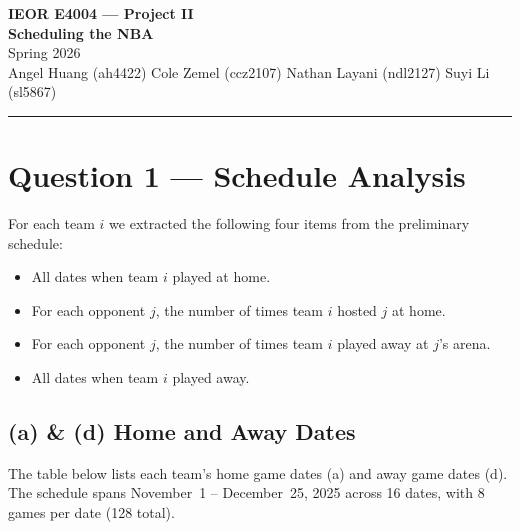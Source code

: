 \documentclass[11pt, letterpaper]{article}
\begin{document}
\begin{center}
  {\LARGE\bfseries IEOR E4004 --- Project II}\\[6pt]
  {\Large\bfseries Scheduling the NBA}\\[10pt]
  {\normalsize Spring 2026}\\[6pt]
  {\normalsize
    Angel Huang (ah4422) \quad Cole Zemel (ccz2107) \quad
    Nathan Layani (ndl2127) \quad Suyi Li (sl5867)}
\end{center}

\vspace{6pt}
\noindent\rule{\linewidth}{1.5pt}
\vspace{4pt}

\tableofcontents
\newpage

\section{Question 1 --- Schedule Analysis}

For each team $i$ we extracted the following four items from the preliminary
schedule:

\begin{itemize}[nosep]
  \item[(a)] All dates when team $i$ played at home.
  \item[(b)] For each opponent $j$, the number of times team $i$ hosted $j$ at
             home.
  \item[(c)] For each opponent $j$, the number of times team $i$ played away at
             $j$'s arena.
  \item[(d)] All dates when team $i$ played away.
\end{itemize}

\subsection{(a) \& (d) Home and Away Dates}

The table below lists each team's home game dates (a) and away game dates (d).
The schedule spans November~1 -- December~25, 2025 across 16 dates, with 8
games per date (128 total).
\end{document}
